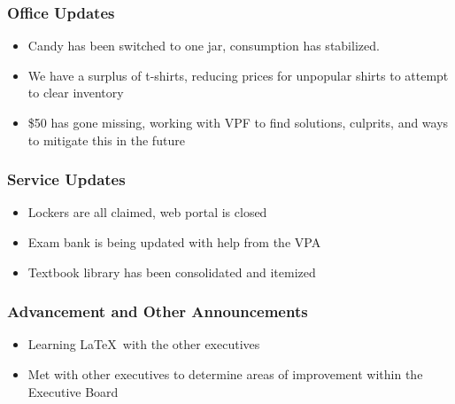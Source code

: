 \subsubsection*{Office Updates}
\begin{itemize}
\item Candy has been switched to one jar, consumption has stabilized. 
\item We have a surplus of t-shirts, reducing prices for unpopular shirts to attempt to clear inventory
\item \$50 has gone missing, working with VPF to find solutions, culprits, and ways to mitigate this in the future
\end{itemize}

\subsubsection*{Service Updates}
\begin{itemize}
\item Lockers are all claimed, web portal is closed
\item Exam bank is being updated with help from the VPA
\item Textbook library has been consolidated and itemized
\end{itemize}

\subsubsection*{Advancement and Other Announcements}
\begin{itemize}
\item Learning \LaTeX\ with the other executives
\item Met with other executives to determine areas of improvement within the Executive Board
\end{itemize}